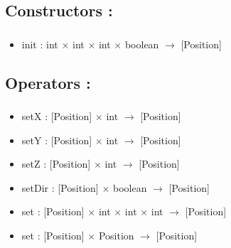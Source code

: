 \documentclass[11pt]{article}
\begin{document}
\subsection{Constructors :}
\label{sec-1.4}

\subsubsection{}

\begin{itemize}

\item init : int $\times$ int $\times$ int $\times$ boolean $\to$ [Position]\\
\label{sec-1.4.1.1}



\end{itemize} %
\subsection{Operators :}
\label{sec-1.5}

\subsubsection{}

\begin{itemize}

\item setX : [Position] $\times$ int $\to$ [Position]\\
\label{sec-1.5.1.1}


\item setY : [Position] $\times$ int $\to$ [Position]\\
\label{sec-1.5.1.2}


\item setZ : [Position] $\times$ int $\to$ [Position]\\
\label{sec-1.5.1.3}


\item setDir : [Position] $\times$ boolean $\to$ [Position]\\
\label{sec-1.5.1.4}


\item set : [Position] $\times$ int $\times$ int $\times$ int $\to$ [Position]\\
\label{sec-1.5.1.5}


\item set : [Position] $\times$ Position $\to$ [Position]\\
\label{sec-1.5.1.6}


\end{itemize} %
\end{document}
